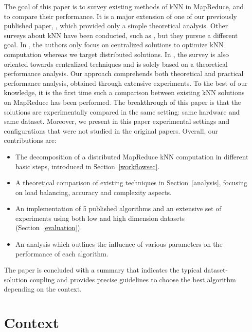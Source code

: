 \documentclass[10pt,journal,compsoc]{IEEEtran}
\begin{document}
The goal of this paper is to survey existing methods of kNN in MapReduce, and to compare their performance. It is a 
major extension of one of our previously published paper, \cite{song:hal-01097337}, which provided only a simple 
theoretical analysis. 
Other surveys about kNN have been conducted, such as \cite{SurveyNNTechniques,Jiang:2007:SIK:1302500.1303257}, but they 
pursue a different goal. In \cite{SurveyNNTechniques}, the authors 
only focus on centralized solutions to optimize kNN computation whereas we target distributed solutions. In 
\cite{Jiang:2007:SIK:1302500.1303257}, the 
survey is also oriented towards centralized techniques and is solely based on a theoretical performance analysis. Our 
approach comprehends both 
theoretical and practical performance analysis, obtained through extensive 
experiments. To the best of our knowledge, it is the first time such a comparison between existing kNN solutions on 
MapReduce has been performed. The breakthrough of this paper is that the solutions are experimentally compared in the 
same setting: same hardware and same dataset. 
Moreover, we present in this paper experimental settings and configurations that were not studied in the original 
papers.
Overall, our contributions are:
\begin{itemize}[noitemsep,nolistsep]
\item The decomposition of a distributed MapReduce kNN computation in different basic steps, introduced in Section~\ref{workflowsec}.
\item A theoretical comparison of existing techniques in Section~\ref{analysis}, focusing on load balancing, accuracy and complexity aspects.
\item An implementation of 5 published algorithms and an extensive set of experiments using both low and high dimension 
datasets (Section~\ref{evaluation}).
\item An analysis which outlines the influence of various parameters on the performance of each algorithm.
\end{itemize}
The paper is concluded with a summary that indicates the typical dataset-solution coupling and provides
precise guidelines to choose the best algorithm depending on the context.
%
\section{Context}
\end{document}
